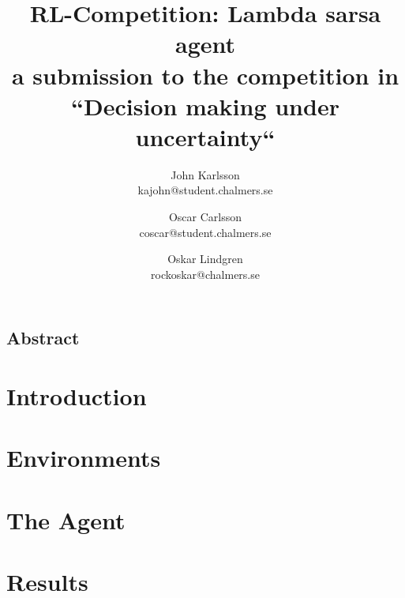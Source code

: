 \documentclass[letterpaper,twocolumn,10pt]{article}
\begin{document}
\date{}

\title{ RL-Competition: Lambda sarsa agent\\ \small a submission to the competition in ``Decision making under uncertainty``}

\author{
{\rm John Karlsson}\\
kajohn@student.chalmers.se
\and
{\rm Oscar Carlsson}\\
coscar@student.chalmers.se
\and
{\rm Oskar Lindgren}\\
rockoskar@chalmers.se
}

\maketitle

\thispagestyle{empty}


\subsection*{Abstract}


\section{Introduction}


\section{Environments}


\section{The Agent}


\section{Results}



{\footnotesize 
}


\theendnotes
\end{document}

